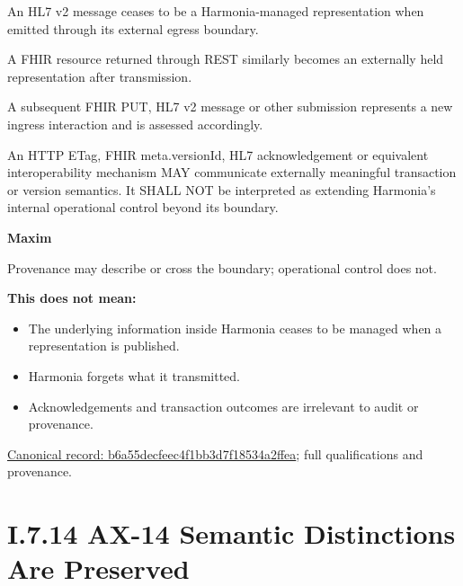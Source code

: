 An HL7 v2 message ceases to be a Harmonia-managed representation when
emitted through its external egress boundary.



A FHIR resource returned through REST similarly becomes an externally
held representation after transmission.



A subsequent FHIR PUT, HL7 v2 message or other submission represents a
new ingress interaction and is assessed accordingly.



An HTTP ETag, FHIR meta.versionId, HL7 acknowledgement or equivalent
interoperability mechanism MAY communicate externally meaningful
transaction or version semantics. It SHALL NOT be interpreted as
extending Harmonia's internal operational control beyond its boundary.



\par\medskip\textbf{Maxim}\par


Provenance may describe or cross the boundary; operational control does
not.



\textbf{This does not mean:}



\begin{itemize}


\item The underlying information inside Harmonia ceases to be managed when a representation is published.

\item Harmonia forgets what it transmitted.

\item Acknowledgements and transaction outcomes are irrelevant to audit or provenance.

\end{itemize}

{\footnotesize \href{../../../../../../../../continuum/motivation/principle/b6a55decfeec4f1bb3d7f18534a2ffea.md}{Canonical record: b6a55decfeec4f1bb3d7f18534a2ffea}; full qualifications and provenance.}\par
\section*{I.7.14 AX-14 Semantic Distinctions Are Preserved}
\label{navigation:I.7.14}

